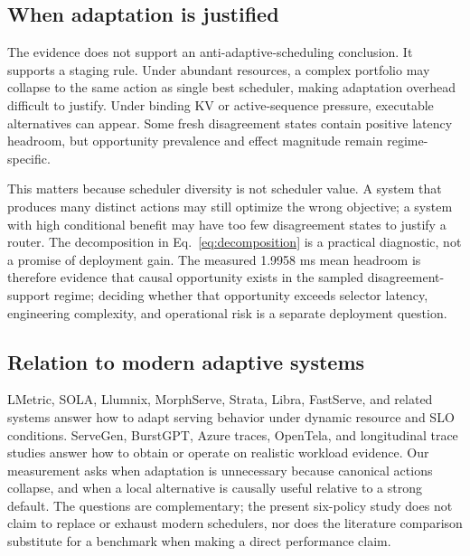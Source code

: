 \documentclass[preprint,12pt]{elsarticle}
\begin{document}
\subsection{When adaptation is justified}
The evidence does not support an anti-adaptive-scheduling conclusion. It
supports a staging rule. Under abundant resources, a complex portfolio may
collapse to the same action as single best scheduler, making adaptation overhead difficult to
justify. Under binding KV or active-sequence pressure, executable alternatives
can appear. Some fresh disagreement states contain positive latency headroom,
but opportunity prevalence and effect magnitude remain regime-specific.

This matters because scheduler diversity is not scheduler value. A system
that produces many distinct actions may still optimize the wrong objective;
a system with high conditional benefit may have too few disagreement states to
justify a router. The decomposition in Eq.~\ref{eq:decomposition} is a
practical diagnostic, not a promise of deployment gain. The measured 1.9958
ms mean headroom is therefore evidence that causal opportunity exists in the
sampled disagreement-support regime; deciding whether that opportunity
exceeds selector latency, engineering complexity, and operational risk is a
separate deployment question.

\subsection{Relation to modern adaptive systems}
LMetric, SOLA, Llumnix, MorphServe, Strata, Libra, FastServe, and related
systems answer how to adapt serving behavior under dynamic resource and SLO
conditions. ServeGen, BurstGPT, Azure traces, OpenTela, and longitudinal
trace studies answer how to obtain or operate on realistic workload evidence.
Our measurement asks when adaptation is unnecessary because canonical actions
collapse, and when a local alternative is causally useful relative to a
strong default. The questions are complementary; the present six-policy study does
not claim to replace or exhaust modern schedulers, nor does the literature
comparison substitute for a benchmark when making a direct performance claim.
\end{document}
